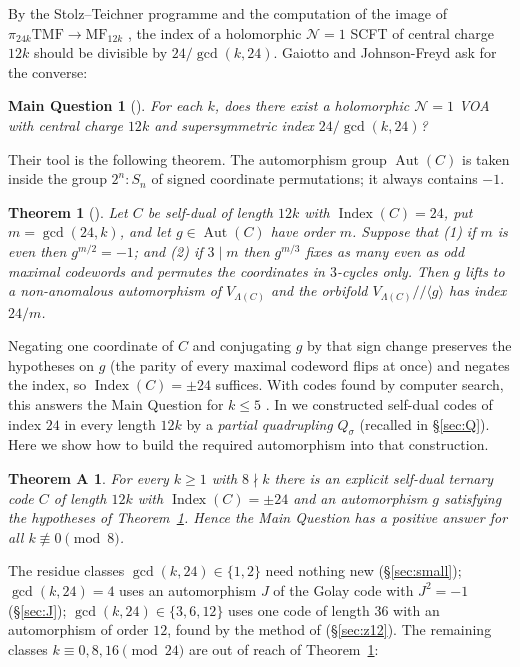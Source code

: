 \documentclass[11pt]{amsart}
\newtheorem{theorem}{Theorem}[section]
\newtheorem*{mainq}{Main Question}
\newtheorem*{thmA}{Theorem A}
\theoremstyle{definition}
\newcommand{\Index}{\operatorname{Index}}
\newcommand{\Aut}{\operatorname{Aut}}
\begin{document}
By the Stolz--Teichner programme and the computation of the image of $\pi_{24k}\mathrm{TMF}\to
\mathrm{MF}_{12k}$ \cite{Hopkins}, the index of a holomorphic $\mathcal N=1$ SCFT of central charge
$12k$ should be divisible by $24/\gcd(k,24)$. Gaiotto and Johnson-Freyd ask for the converse:

\begin{mainq}[{\cite{GJF}}]
For each $k$, does there exist a holomorphic $\mathcal N=1$ VOA with central charge $12k$ and
supersymmetric index $24/\gcd(k,24)$?
\end{mainq}

Their tool is the following theorem. The automorphism group $\Aut(C)$ is taken inside the group
$2^n{:}S_n$ of signed coordinate permutations; it always contains $-1$.

\begin{theorem}[{\cite[Thm.~5.6]{GJF}}]\label{thm:gjf}
Let $C$ be self-dual of length $12k$ with $\Index(C)=24$, put $m=\gcd(24,k)$, and let
$g\in\Aut(C)$ have order $m$. Suppose that (1) if $m$ is even then $g^{m/2}=-1$; and (2) if
$3\mid m$ then $g^{m/3}$ fixes as many even as odd maximal codewords and permutes the coordinates
in $3$-cycles only. Then $g$ lifts to a non-anomalous automorphism of $V_{\Lambda(C)}$ and the
orbifold $V_{\Lambda(C)}/\!\!/\langle g\rangle$ has index $24/m$.
\end{theorem}

Negating one coordinate of $C$ and conjugating $g$ by that sign change preserves the hypotheses
on $g$ (the parity of every maximal codeword flips at once) and negates the index, so
$\Index(C)=\pm24$ suffices. With codes found by computer search, this answers the Main Question for $k\le5$
\cite[Ex.~5.7]{GJF}. In \cite{BR} we constructed self-dual codes of index $24$ in every length
$12k$ by a \emph{partial quadrupling} $Q_\sigma$ (recalled in \S\ref{sec:Q}). Here we show how to
build the required automorphism into that construction.

\begin{thmA}
For every $k\ge1$ with $8\nmid k$ there is an explicit self-dual ternary code $C$ of length $12k$
with $\Index(C)=\pm24$ and an automorphism $g$ satisfying the hypotheses of
Theorem~\ref{thm:gjf}. Hence the Main Question has a positive answer for all $k\not\equiv0\pmod8$.
\end{thmA}

The residue classes $\gcd(k,24)\in\{1,2\}$ need nothing new (\S\ref{sec:small}); $\gcd(k,24)=4$
uses an automorphism $J$ of the Golay code with $J^2=-1$ (\S\ref{sec:J}); $\gcd(k,24)\in\{3,6,12\}$
uses one code of length $36$ with an automorphism of order $12$, found by the method of
\cite{GJF} (\S\ref{sec:z12}). The remaining classes $k\equiv0,8,16\pmod{24}$ are out of reach of
Theorem~\ref{thm:gjf}:
\end{document}
